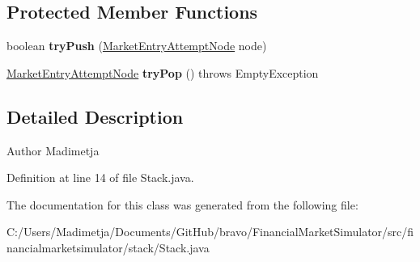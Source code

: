 \subsection*{Protected Member Functions}
\begin{DoxyCompactItemize}
\item 
\hypertarget{classfinancialmarketsimulator_1_1stack_1_1_stack_a2566c4821f0d3091cdac87b5ee7404bf}{boolean {\bfseries try\+Push} (\hyperlink{classfinancialmarketsimulator_1_1stack_1_1_market_entry_attempt_node}{Market\+Entry\+Attempt\+Node} node)}\label{classfinancialmarketsimulator_1_1stack_1_1_stack_a2566c4821f0d3091cdac87b5ee7404bf}

\item 
\hypertarget{classfinancialmarketsimulator_1_1stack_1_1_stack_aacd57a41238742e12b8ee9f20b93b162}{\hyperlink{classfinancialmarketsimulator_1_1stack_1_1_market_entry_attempt_node}{Market\+Entry\+Attempt\+Node} {\bfseries try\+Pop} ()  throws Empty\+Exception }\label{classfinancialmarketsimulator_1_1stack_1_1_stack_aacd57a41238742e12b8ee9f20b93b162}

\end{DoxyCompactItemize}


\subsection{Detailed Description}
\begin{DoxyAuthor}{Author}
Madimetja 
\end{DoxyAuthor}


Definition at line 14 of file Stack.\+java.



The documentation for this class was generated from the following file\+:\begin{DoxyCompactItemize}
\item 
C\+:/\+Users/\+Madimetja/\+Documents/\+Git\+Hub/bravo/\+Financial\+Market\+Simulator/src/financialmarketsimulator/stack/Stack.\+java\end{DoxyCompactItemize}
